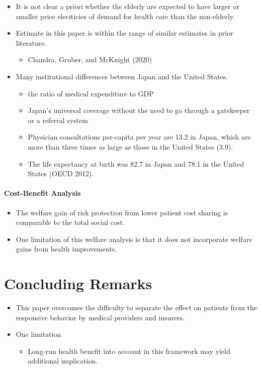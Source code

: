 \documentclass[../root]{subfiles}
\begin{document}
    \begin{itemize}
      \item It is not clear a priori whether the elderly are expected to have larger or smaller price eleciticies of demand for health care than the non-elderly.
      \item Estimate in this paper is within the range of similar estimates in prior literature.
      \begin{itemize}
        \item Chandra, Gruber, and McKnight (2020)
      \end{itemize}
      \item Many institutional differences between Japan and the United States.
      \begin{itemize}
        \item the ratio of medical expenditure to GDP
        \item Japan’s universal coverage without the need to go through a gatekeeper or a referral system
        \item Physician consultations per-capita per year are 13.2 in Japan, which are more than three times as large as those in the United States (3.9).
        \item The life expectancy at birth was 82.7 in Japan and 78.1 in the United States (OECD 2012).
      \end{itemize}
    \end{itemize}

    \paragraph{Cost-Benefit Analysis}

    \begin{itemize}
      \item The welfare gain of risk protection from lower patient cost sharing is comparable to the total social cost.
      \item One limitation of this welfare analysis is that it does not incorporate welfare gains from health improvements.
    \end{itemize}

    \section{Concluding Remarks}

    \begin{itemize}
      \item This paper overcomes the difficulty to separate the effect on patients from the responsive behavior by medical providers and insurers.
      \item One limitation
      \begin{itemize}
        \item Long-run health benefit into account in this framework may yield additional implication.
      \end{itemize}
    \end{itemize}


    \biblio
\end{document}
